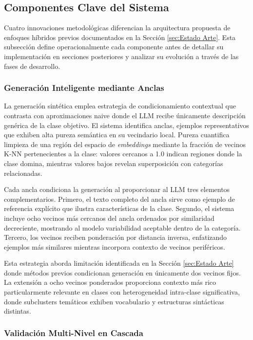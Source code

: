\subsection{Componentes Clave del Sistema}
\label{subsec:componentes_clave}

Cuatro innovaciones metodológicas diferencian la arquitectura propuesta de enfoques híbridos previos documentados en la Sección \ref{sec:Estado Arte}. Esta subsección define operacionalmente cada componente antes de detallar su implementación en secciones posteriores y analizar su evolución a través de las fases de desarrollo.

\subsubsection*{Generación Inteligente mediante Anclas}

La generación sintética emplea estrategia de condicionamiento contextual que contrasta con aproximaciones naive donde el LLM recibe únicamente descripción genérica de la clase objetivo. El sistema identifica anclas, ejemplos representativos que exhiben alta pureza semántica en su vecindario local. Pureza cuantifica limpieza de una región del espacio de \textit{embeddings} mediante la fracción de vecinos K-NN pertenecientes a la clase: valores cercanos a 1.0 indican regiones donde la clase domina, mientras valores bajos revelan superposición con categorías relacionadas.

Cada ancla condiciona la generación al proporcionar al LLM tres elementos complementarios. Primero, el texto completo del ancla sirve como ejemplo de referencia explícito que ilustra características de la clase. Segundo, el sistema incluye ocho vecinos más cercanos del ancla ordenados por similaridad decreciente, mostrando al modelo variabilidad aceptable dentro de la categoría. Tercero, los vecinos reciben ponderación por distancia inversa, enfatizando ejemplos más similares mientras incorpora contexto de vecinos periféricos.

Esta estrategia aborda limitación identificada en la Sección \ref{sec:Estado Arte} donde métodos previos condicionan generación en únicamente dos vecinos fijos. La extensión a ocho vecinos ponderados proporciona contexto más rico particularmente relevante en clases con heterogeneidad intra-clase significativa, donde subclusters temáticos exhiben vocabulario y estructuras sintácticas distintas.

\subsubsection*{Validación Multi-Nivel en Cascada}

